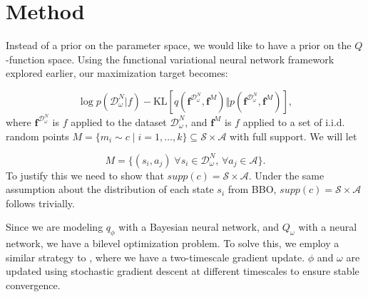 \documentclass[]{uai2021} %
\newcommand{\R}{\mathbb{R}}
\newcommand{\D}{\mathcal{D}}
\newcommand{\f}{\mathbf{f}}
\newcommand{\state}{\mathcal{S}}
\newcommand{\action}{\mathcal{A}}
\newcommand{\KL}{\mathrm{KL}}
\begin{document}
\section{Method}
Instead of a prior on the parameter space, we would like to have a prior on the \(Q\)-function space.
Using the functional variational neural network framework explored earlier, our maximization target
becomes:

\begin{equation}
    \log p(\D_\omega^N \vert f) - \KL \left[ q(\f^{\D_\omega^N}, \f^M) \Vert p(\f^{\D_\omega^N}, \f^M) \right],
\end{equation}
where \(\f^{\D_\omega^N}\) is \(f\) applied to the dataset \(\D_\omega^N\), and \(\f^M\) is \(f\) applied to
a set of i.i.d. random points \(M = \{m_i \sim c \mid i=1,\dots,k\} \subseteq \state \times \action\)
with full support. We will let

\begin{equation}
    M = \{(s_i, a_j) \; \forall s_i \in \D_\omega^N,\, \forall a_j \in \action\}. 
\end{equation}
To justify this we need to show that \(supp(c) = \state \times \action\).
Under the same assumption about the distribution of each state \(s_i\) from BBO,
\(supp(c) = \state \times \action\) follows trivially.

Since we are modeling \(q_\phi\) with a Bayesian neural network, and \(Q_\omega\) with a neural network,
we have a bilevel optimization problem. To solve this, we employ a similar strategy to \cite{fellows_bayesian_2021},
where we have a two-timescale gradient update. \(\phi\) and \(\omega\) are updated using stochastic
gradient descent at different timescales to ensure stable convergence.

\end{document}
